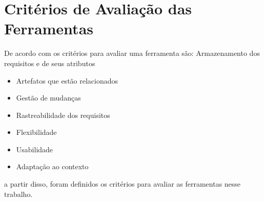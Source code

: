 \section[Critérios de Avaliação das Ferramentas]{Critérios de Avaliação das Ferramentas}

De acordo com  os critérios para avaliar uma ferramenta são: 
Armazenamento dos requisitos e de seus atributos
\begin{itemize}
  \item Artefatos que estão relacionados
  \item Gestão de mudanças
  \item Rastreabilidade dos requisitos
  \item Flexibilidade
  \item Usabilidade
  \item Adaptação ao contexto
\end{itemize} 
a partir disso, foram definidos os critérios para avaliar as ferramentas nesse trabalho.
